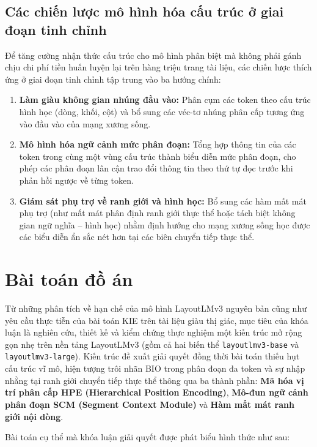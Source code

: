 \subsection{Các chiến lược mô hình hóa cấu trúc ở giai đoạn tinh chỉnh}
Để tăng cường nhận thức cấu trúc cho mô hình phân biệt mà không phải gánh chịu chi phí tiền huấn luyện lại trên hàng triệu trang tài liệu, các chiến lược thích ứng ở giai đoạn tinh chỉnh tập trung vào ba hướng chính:
\begin{enumerate}
    \item \textbf{Làm giàu không gian nhúng đầu vào:} Phân cụm các token theo cấu trúc hình học (dòng, khối, cột) và bổ sung các véc-tơ nhúng phân cấp tương ứng vào đầu vào của mạng xương sống.
    \item \textbf{Mô hình hóa ngữ cảnh mức phân đoạn:} Tổng hợp thông tin của các token trong cùng một vùng cấu trúc thành biểu diễn mức phân đoạn, cho phép các phân đoạn lân cận trao đổi thông tin theo thứ tự đọc trước khi phản hồi ngược về từng token.
    \item \textbf{Giám sát phụ trợ về ranh giới và hình học:} Bổ sung các hàm mất mát phụ trợ (như mất mát phân định ranh giới thực thể hoặc tách biệt không gian ngữ nghĩa -- hình học) nhằm định hướng cho mạng xương sống học được các biểu diễn ẩn sắc nét hơn tại các biên chuyển tiếp thực thể.
\end{enumerate}

\section{Bài toán đồ án}
Từ những phân tích về hạn chế của mô hình LayoutLMv3 nguyên bản cũng như yêu cầu thực tiễn của bài toán KIE trên tài liệu giàu thị giác, mục tiêu của khóa luận là nghiên cứu, thiết kế và kiểm chứng thực nghiệm một kiến trúc mở rộng gọn nhẹ trên nền tảng LayoutLMv3 (gồm cả hai biến thể \texttt{layoutlmv3-base} và \texttt{layoutlmv3-large}). Kiến trúc đề xuất giải quyết đồng thời bài toán thiếu hụt cấu trúc vĩ mô, hiện tượng trôi nhãn BIO trong phân đoạn đa token và sự nhập nhằng tại ranh giới chuyển tiếp thực thể thông qua ba thành phần: \textbf{Mã hóa vị trí phân cấp HPE (Hierarchical Position Encoding)}, \textbf{Mô-đun ngữ cảnh phân đoạn SCM (Segment Context Module)} và \textbf{Hàm mất mát ranh giới nội dòng}.

Bài toán cụ thể mà khóa luận giải quyết được phát biểu hình thức như sau:

